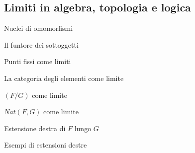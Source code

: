 \subsection{Limiti in algebra, topologia e logica}
\begin{example}
	Nuclei di omomorfismi
\end{example}
\begin{example}
	Il funtore dei sottoggetti
\end{example}
\begin{example}
	Punti fissi come limiti
\end{example}
\begin{example}
	La categoria degli elementi come limite
\end{example}
\begin{example}
	\((F/G)\) come limite
\end{example}
\begin{example}
	\(Nat(F,G)\) come limite
\end{example}
\begin{example}
	Estensione destra di \(F\) lungo \(G\)
\end{example}
\begin{examples}
	Esempi di estensioni destre
\end{examples}

